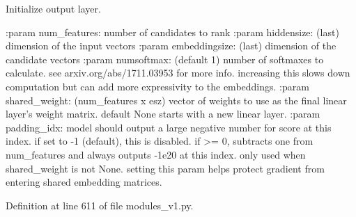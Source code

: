 \begin{DoxyVerb}Initialize output layer.

:param num_features:  number of candidates to rank
:param hiddensize:    (last) dimension of the input vectors
:param embeddingsize: (last) dimension of the candidate vectors
:param numsoftmax:   (default 1) number of softmaxes to calculate.
              see arxiv.org/abs/1711.03953 for more info.
              increasing this slows down computation but can
              add more expressivity to the embeddings.
:param shared_weight: (num_features x esz) vector of weights to use as
              the final linear layer's weight matrix. default
              None starts with a new linear layer.
:param padding_idx:   model should output a large negative number for
              score at this index. if set to -1 (default),
              this is disabled. if >= 0, subtracts one from
              num_features and always outputs -1e20 at this
              index. only used when shared_weight is not None.
              setting this param helps protect gradient from
              entering shared embedding matrices.
\end{DoxyVerb}
 

Definition at line 611 of file modules\+\_\+v1.\+py.


